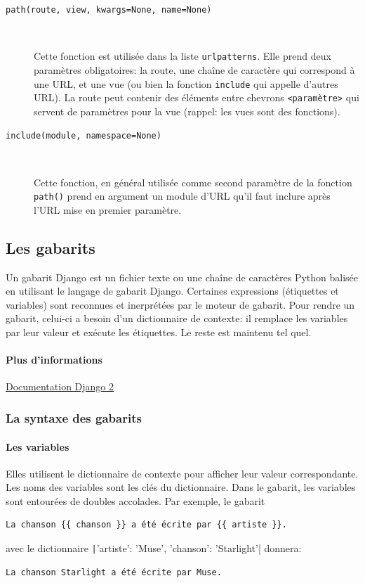 \documentclass[a4paper, 10pt]{article}
\begin{document}
\begin{description}
    \item[\texttt{path(route, view, kwargs=None, name=None)}]~

          Cette fonction est utilisée dans la liste \texttt{urlpatterns}. Elle prend deux paramètres obligatoires: la route, une chaîne de caractère qui correspond à une URL, et une vue (ou bien la fonction \texttt{include} qui appelle d'autres URL). La route peut contenir des éléments entre chevrons \texttt{<paramètre>} qui servent de paramètres pour la vue (rappel: les vues sont des fonctions).

    \item[\texttt{include(module, namespace=None)}]~

          Cette fonction, en général utilisée comme second paramètre de la fonction \texttt{path()} prend en argument un module d'URL qu'il faut inclure après l'URL mise en premier paramètre.
\end{description}


\subsection{Les gabarits}
Un gabarit Django est un fichier texte ou une chaîne de caractères Python balisée en utilisant le langage de gabarit Django. Certaines expressions (étiquettes et variables) sont reconnues et inerprétées par le moteur de gabarit. Pour rendre un gabarit, celui-ci a besoin d'un dictionnaire de contexte: il remplace les variables par leur valeur et exécute les étiquettes. Le reste est maintenu tel quel.

\paragraph{Plus d'informations} \href{https://docs.djangoproject.com/fr/2.2/topics/templates/}{Documentation Django 2}


\subsubsection{La syntaxe des gabarits}
\paragraph{Les variables}
Elles utilisent le dictionnaire de contexte pour afficher leur valeur correspondante. Les noms des variables sont les clés du dictionnaire. Dans le gabarit, les variables sont entourées de doubles accolades. Par exemple, le gabarit
\begin{verbatim}
La chanson {{ chanson }} a été écrite par {{ artiste }}.
\end{verbatim}
avec le dictionnaire \texttt|{{'artiste': 'Muse', 'chanson': 'Starlight'}}| donnera:
\begin{verbatim}
La chanson Starlight a été écrite par Muse.
\end{verbatim}
\end{document}
